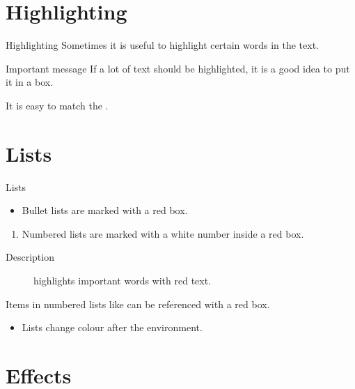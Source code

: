\documentclass[english,aspectratio=169]{beamer}
\begin{document}
\section{Highlighting}
\SectionPage


\begin{frame}{Highlighting}
    Sometimes it is useful to \alert{highlight} certain words in the text.

    \begin{alertblock}{Important message}
        If a lot of text should be \alert{highlighted}, it is a good idea to put it in a box.
    \end{alertblock}

    It is easy to match the .
\end{frame}


\section{Lists}


\begin{frame}{Lists}
    \begin{itemize}
        \item
        Bullet lists are marked with a red box.
    \end{itemize}

    \begin{enumerate}
        \item
        \label{enum:item}
        Numbered lists are marked with a white number inside a red box.
    \end{enumerate}

    \begin{description}
        \item[Description] highlights important words with red text.
    \end{description}

    Items in numbered lists like  can be referenced with a red box.

    \begin{example}
        \begin{itemize}
            \item
            Lists change colour after the environment.
        \end{itemize}
    \end{example}
\end{frame}


\section{Effects}
\end{document}
